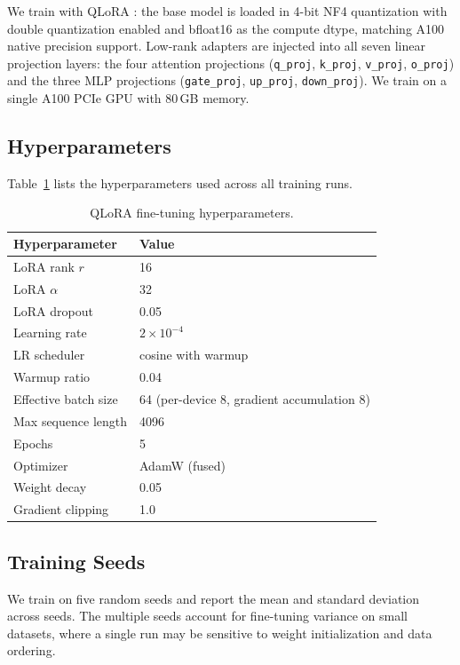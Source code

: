 We train with QLoRA \citep{dettmers2023qlora}: the base model is loaded in 4-bit NF4 quantization with double quantization enabled and bfloat16 as the compute dtype, matching A100 native precision support. Low-rank adapters are injected into all seven linear projection layers: the four attention projections (\texttt{q\_proj}, \texttt{k\_proj}, \texttt{v\_proj}, \texttt{o\_proj}) and the three MLP projections (\texttt{gate\_proj}, \texttt{up\_proj}, \texttt{down\_proj}). We train on a single A100 PCIe GPU with 80\,GB memory.

\subsection{Hyperparameters}

Table~\ref{tab:qlora-hparams} lists the hyperparameters used across all training runs.

\begin{table}[ht]
\centering
\caption{QLoRA fine-tuning hyperparameters.}
\label{tab:qlora-hparams}
\begin{tabular}{@{}ll@{}}
\toprule
\textbf{Hyperparameter} & \textbf{Value} \\
\midrule
LoRA rank $r$           & 16 \\
LoRA $\alpha$           & 32 \\
LoRA dropout            & 0.05 \\
Learning rate           & $2 \times 10^{-4}$ \\
LR scheduler            & cosine with warmup \\
Warmup ratio            & 0.04 \\
Effective batch size    & 64 (per-device 8, gradient accumulation 8) \\
Max sequence length     & 4096 \\
Epochs                  & 5 \\
Optimizer               & AdamW (fused) \\
Weight decay            & 0.05 \\
Gradient clipping       & 1.0 \\
\bottomrule
\end{tabular}
\end{table}

\subsection{Training Seeds}

We train on five random seeds and report the mean and standard deviation across seeds. The multiple seeds account for fine-tuning variance on small datasets, where a single run may be sensitive to weight initialization and data ordering.
